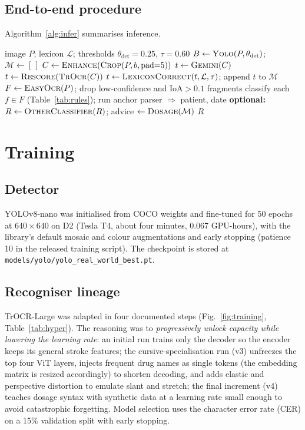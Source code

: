 \documentclass[journal]{IEEEtran}
\newcommand{\sys}{\textsc{Medi-Script-AI}}
\begin{document}
\subsection{End-to-end procedure}
Algorithm~\ref{alg:infer} summarises inference.

\begin{algorithm}[t]
\caption{\sys{} inference}\label{alg:infer}
\begin{algorithmic}[1]
\Require image $P$; lexicon $\mathcal{L}$; thresholds $\theta_{\text{det}}{=}0.25$, $\tau{=}0.60$
\State $B\gets\textsc{Yolo}(P,\theta_{\text{det}})$; $\mathcal{M}\gets[\,]$
  \State $C\gets\textsc{Enhance}(\textsc{Crop}(P,b,\mathrm{pad}{=}5))$
  \State $t\gets\textsc{Gemini}(C)$
   $t\gets\textsc{Rescore}(\textsc{TrOcr}(C))$ \EndIf
  \State $t\gets\textsc{LexiconCorrect}(t,\mathcal{L},\tau)$; append $t$ to $\mathcal{M}$
\EndFor
\State $F\gets\textsc{EasyOcr}(P)$; drop low-confidence and $\mathrm{IoA}>0.1$ fragments
\State classify each $f\in F$ (Table~\ref{tab:rules}); run anchor parser $\Rightarrow$ patient, date
\State \textbf{optional:} $R\gets\textsc{OtherClassifier}(R)$; advice $\gets\textsc{Dosage}(\mathcal{M})$
\State \Return $R$
\end{algorithmic}
\end{algorithm}

\section{Training}\label{sec:train}

\subsection{Detector}
YOLOv8-nano was initialised from COCO weights and fine-tuned for 50 epochs at $640{\times}640$ on D2 (Tesla T4, about four minutes, 0.067 GPU-hours), with the library's default mosaic and colour augmentations and early stopping (patience 10 in the released training script). The checkpoint is stored at \texttt{models/yolo/yolo\_real\_world\_best.pt}.

\subsection{Recogniser lineage}
TrOCR-Large was adapted in four documented steps (Fig.~\ref{fig:training}, Table~\ref{tab:hyper}). The reasoning was to \emph{progressively unlock capacity while lowering the learning rate}: an initial run trains only the decoder so the encoder keeps its general stroke features; the cursive-specialisation run (v3) unfreezes the top four ViT layers, injects frequent drug names as single tokens (the embedding matrix is resized accordingly) to shorten decoding, and adds elastic and perspective distortion to emulate slant and stretch; the final increment (v4) teaches dosage syntax with synthetic data at a learning rate small enough to avoid catastrophic forgetting. Model selection uses the character error rate (CER) on a 15\% validation split with early stopping.
\end{document}
